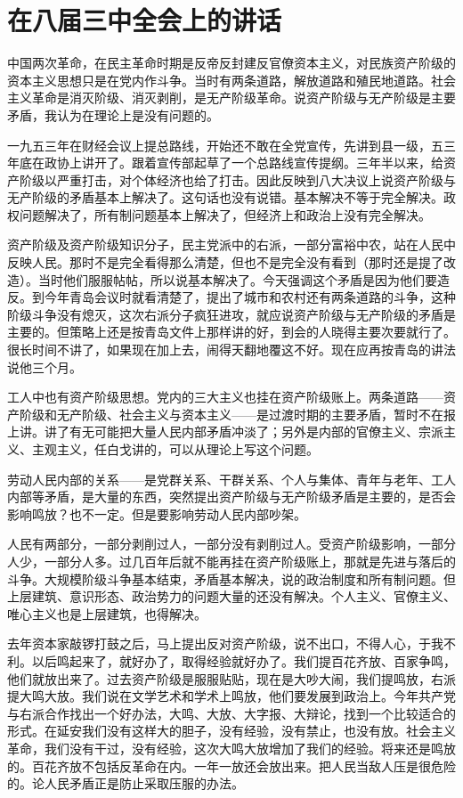 \section[在八届三中全会上的讲话（一九五七年十月七日）]{在八届三中全会上的讲话}


中国两次革命，在民主革命时期是反帝反封建反官僚资本主义，对民族资产阶级的资本主义思想只是在党内作斗争。当时有两条道路，解放道路和殖民地道路。社会主义革命是消灭阶级、消灭剥削，是无产阶级革命。说资产阶级与无产阶级是主要矛盾，我认为在理论上是没有问题的。

一九五三年在财经会议上提总路线，开始还不敢在全党宣传，先讲到县一级，五三年底在政协上讲开了。跟着宣传部起草了一个总路线宣传提纲。三年半以来，给资产阶级以严重打击，对个体经济也给了打击。因此反映到八大决议上说资产阶级与无产阶级的矛盾基本上解决了。这句话也没有说错。基本解决不等于完全解决。政权问题解决了，所有制问题基本上解决了，但经济上和政治上没有完全解决。

资产阶级及资产阶级知识分子，民主党派中的右派，一部分富裕中农，站在人民中反映人民。那时不是完全看得那么清楚，但也不是完全没有看到（那时还是提了改造）。当时他们服服帖帖，所以说基本解决了。今天强调这个矛盾是因为他们要造反。到今年青岛会议时就看清楚了，提出了城市和农村还有两条道路的斗争，这种阶级斗争没有熄灭，这次右派分子疯狂进攻，就应说资产阶级与无产阶级的矛盾是主要的。但策略上还是按青岛文件上那样讲的好，到会的人晓得主要次要就行了。很长时间不讲了，如果现在加上去，闹得天翻地覆这不好。现在应再按青岛的讲法说他三个月。

工人中也有资产阶级思想。党内的三大主义也挂在资产阶级账上。两条道路——资产阶级和无产阶级、社会主义与资本主义——是过渡时期的主要矛盾，暂时不在报上讲。讲了有无可能把大量人民内部矛盾冲淡了；另外是内部的官僚主义、宗派主义、主观主义，任白戈讲的，可以从理论上写这个问题。

劳动人民内部的关系——是党群关系、干群关系、个人与集体、青年与老年、工人内部等矛盾，是大量的东西，突然提出资产阶级与无产阶级矛盾是主要的，是否会影响鸣放？也不一定。但是要影响劳动人民内部吵架。

人民有两部分，一部分剥削过人，一部分没有剥削过人。受资产阶级影响，一部分人少，一部分人多。过几百年后就不能再挂在资产阶级账上，那就是先进与落后的斗争。大规模阶级斗争基本结束，矛盾基本解决，说的政治制度和所有制问题。但上层建筑、意识形态、政治势力的问题大量的还没有解决。个人主义、官僚主义、唯心主义也是上层建筑，也得解决。

去年资本家敲锣打鼓之后，马上提出反对资产阶级，说不出口，不得人心，于我不利。以后鸣起来了，就好办了，取得经验就好办了。我们提百花齐放、百家争鸣，他们就放出来了。过去资产阶级是服服贴贴，现在是大吵大闹，我们提鸣放，右派提大鸣大放。我们说在文学艺术和学术上鸣放，他们要发展到政治上。今年共产党与右派合作找出一个好办法，大鸣、大放、大字报、大辩论，找到一个比较适合的形式。在延安我们没有这样大的胆子，没有经验，没有禁止，也没有放。社会主义革命，我们没有干过，没有经验，这次大鸣大放增加了我们的经验。将来还是鸣放的。百花齐放不包括反革命在内。一年一放还会放出来。把人民当敌人压是很危险的。论人民矛盾正是防止采取压服的办法。

